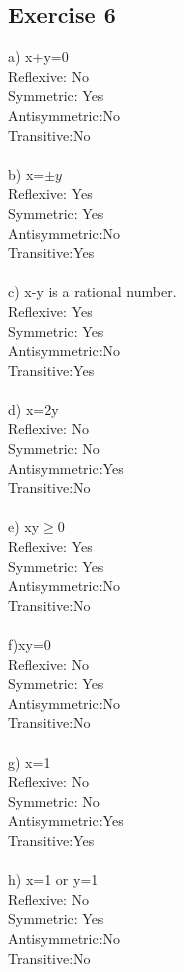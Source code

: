 \documentclass[12pt]{article}
\begin{document}
\subsection*{Exercise 6}
a) x+y=0\\
Reflexive: No\\
Symmetric: Yes\\
Antisymmetric:No\\
Transitive:No\\
\\
b) x=$\pm y$\\
Reflexive: Yes\\
Symmetric: Yes\\
Antisymmetric:No\\
Transitive:Yes\\
\\
c) x-y is a rational number.\\
Reflexive: Yes\\
Symmetric: Yes\\
Antisymmetric:No\\
Transitive:Yes\\
\\
d) x=2y\\
Reflexive: No\\
Symmetric: No\\
Antisymmetric:Yes\\
Transitive:No\\
\\
e) xy$\geq 0$\\
Reflexive: Yes\\
Symmetric: Yes\\
Antisymmetric:No\\
Transitive:No\\
\\
f)xy=0\\
Reflexive: No\\
Symmetric: Yes\\
Antisymmetric:No\\
Transitive:No\\
\\
g) x=1\\
Reflexive: No\\
Symmetric: No\\
Antisymmetric:Yes\\
Transitive:Yes\\
\\
h) x=1 or y=1\\
Reflexive: No\\
Symmetric: Yes\\
Antisymmetric:No\\
Transitive:No\\
\\
\end{document}

